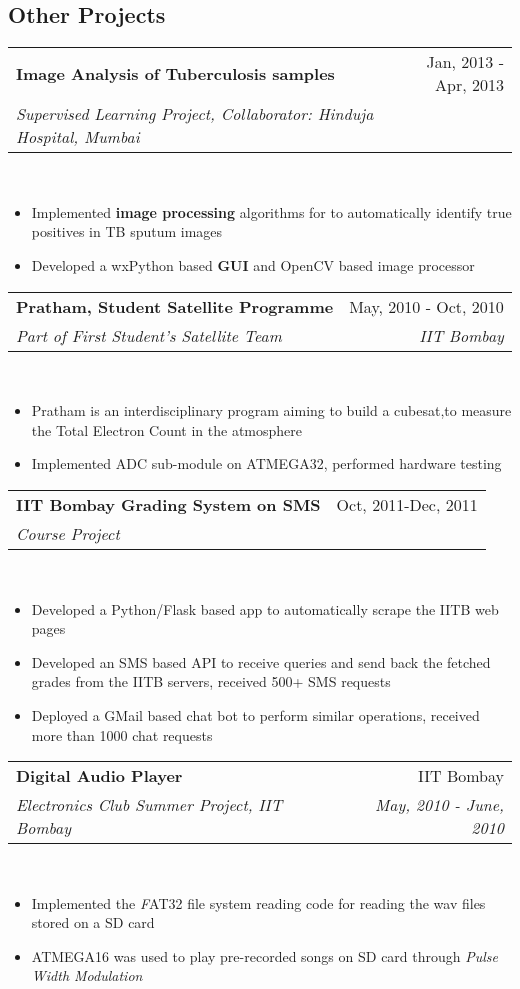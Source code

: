 \documentclass[margin,line]{res}
\makeatletter
\newcommand{\ressubheading}[4]{
    \begin{tabular*}{6.25in}{l@{\extracolsep{\fill}}r}
        \textbf{#1} & #2 \\
        \textit{#3} & \textit{#4} \\
    \end{tabular*}\vspace{-6pt}
}
\makeatother
\begin{document}
\begin{resume}

\section{\sc Other Projects} 
\ressubheading{\bf{Image Analysis of Tuberculosis samples}}{Jan, 2013 - Apr, 2013}
{Supervised Learning Project, Collaborator: Hinduja Hospital, Mumbai}{}\\
\begin{itemize}
\item{Implemented {\bf{image processing}} algorithms for to automatically identify true positives in TB sputum images}
\item{Developed a wxPython based {\bf{GUI}} and OpenCV based image processor}
\end{itemize}

\pagebreak
\ressubheading{\bf{Pratham, Student Satellite Programme}}{May, 2010 - Oct, 2010}
{Part of First Student's Satellite Team}{IIT Bombay}\\
\begin{itemize}
\item{Pratham is an interdisciplinary program aiming to build a cubesat,to measure the Total Electron Count in the atmosphere}
\item{Implemented ADC sub-module on ATMEGA32, performed hardware testing}
\end{itemize}

\vspace{.3cm}
\ressubheading{\bf{IIT Bombay Grading System on SMS}}{Oct, 2011-Dec, 2011}
{Course  Project}{}\\
\begin{itemize}
    \item{Developed a Python/Flask based app to automatically scrape the  IITB web pages }
    \item{Developed an SMS based API to receive queries and send back the fetched grades from the IITB servers, received 500+ SMS requests }
    \item{Deployed a GMail based chat bot to perform similar operations, received more than 1000 chat requests}
\end{itemize}

\vspace{.3cm}
\ressubheading{Digital Audio Player}{IIT Bombay}
{Electronics Club Summer Project, IIT Bombay}{May, 2010 - June, 2010}\\
\begin{itemize}
\item{Implemented the {\emph FAT32} file system reading code for reading the wav files stored on a SD card}
\item{ATMEGA16 was used to play pre-recorded songs on SD card through {\emph{Pulse Width Modulation}} }
\end{itemize}



\end{resume}
\end{document}
